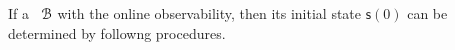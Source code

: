 



 If a \BCN\ ${\mathcal{B}}$ with the online observability, then its initial state $\mathsf{s}(0)$ can be determined by followng procedures.

